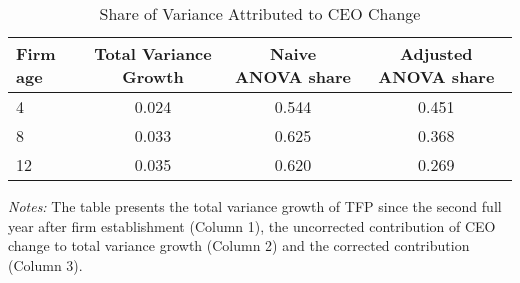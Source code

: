 
\begin{table}[htbp]
\centering
\caption{Share of Variance Attributed to CEO Change}
\vspace{.2cm}
\label{tab:var_share}
\begin{tabular}{lccc}
\toprule
Firm age & Total Variance Growth & Naive ANOVA share & Adjusted ANOVA share \\
\hline
4 &     0.024 &  0.544 &  0.451 \\
8 &     0.033 &  0.625 &  0.368 \\
12 &     0.035 &  0.620 &  0.269 \\ \bottomrule
\end{tabular}
\begin{minipage}{14cm}
\vspace{.2cm}
\footnotesize \textit{Notes:} The table presents the total variance growth of TFP since the second full year after firm establishment (Column 1), the uncorrected contribution of CEO change to total variance growth (Column 2) and the corrected contribution (Column 3). 
\end{minipage}
\end{table}

